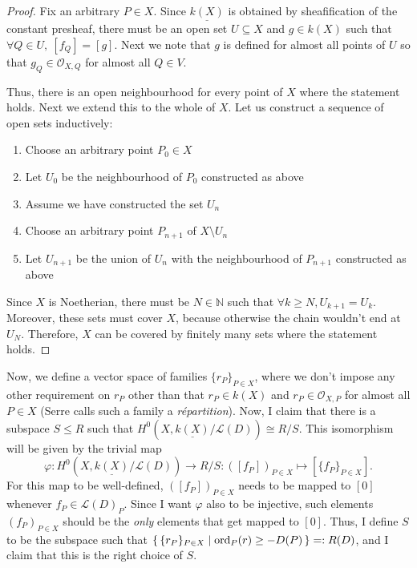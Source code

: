 \documentclass[12pt]{article}
\DeclareMathOperator{\ord}{ord}
\begin{document}
\begin{proof}
  Fix an arbitrary $P\in X$. Since $\underline{k(X)}$ is obtained by
  sheafification of the constant presheaf, there must be an open
  set $U\subseteq X$ and $g\in k(X)$ such that
  $\forall Q\in U,\ [f_{Q}]=[g]$. Next we note that $g$
  is defined for almost all points of $U$ so that $g_{Q}
  \in\mathscr{O}_{X,Q}$ for almost all $Q\in V$.

  Thus, there is an open neighbourhood for every point
  of $X$ where the statement holds. Next we extend this to the whole of $X$.
  Let us construct a sequence of open sets inductively:
  \begin{enumerate}
    \item Choose an arbitrary point $P_{0}\in X$
    \item Let $U_{0}$ be the neighbourhood of $P_{0}$ constructed as above
    \item Assume we have constructed the set $U_{n}$
    \item Choose an arbitrary point $P_{n+1}$ of $X\setminus U_{n}$
    \item Let $U_{n+1}$ be the union of $U_{n}$ with the
          neighbourhood of $P_{n+1}$ constructed as above
  \end{enumerate}
  Since $X$ is Noetherian, there must be $N\in\mathbb{N}$
  such that $\forall k\geq N, U_{k+1}=U_{k}$. Moreover, these sets must
  cover $X$, because otherwise the chain wouldn't end at $U_{N}$.
  Therefore, $X$ can be covered by finitely many sets where the statement
  holds.
\end{proof}
Now, we define a vector space of families $\{r_{P}\}_{P\in X}$, where we don't
impose any other requirement on $r_{P}$ other than that $r_{P}\in k(X)$ and
$r_{P}\in\mathscr{O}_{X,P}$ for almost all $P\in X$ (Serre calls such a
family a \emph{r\'epartition}).
Now, I claim that there is a subspace
$S\leq R$ such that $H^{0}(X,\underline{k(X)}/\mathcal{L}(D))\cong R/S$.
This isomorphism will be given by the trivial map
\[
  \varphi: H^{0}(X,\underline{k(X)}/\mathcal{L}(D))\to R/S
  :([f_{P}])_{P\in X}\mapsto [\{f_{P}\}_{P\in X}].
\]
For this map to be well-defined, $([f_{P}])_{P\in X}$ needs to be
mapped to $[0]$ whenever $f_{P}\in\mathcal{L}(D)_{P}$. Since I want
$\varphi$ also to be injective, such elements $(f_{P})_{P\in X}$ should be
the \emph{only} elements that get mapped to $[0]$. Thus, I define $S$
to be the subspace such that $\set{\{r_{P}\}_{P\in X}\mid \ord_{P}(r)
  \geq -D(P)}=:R(D)$, and I claim that this is the right choice of $S$.
\end{document}
